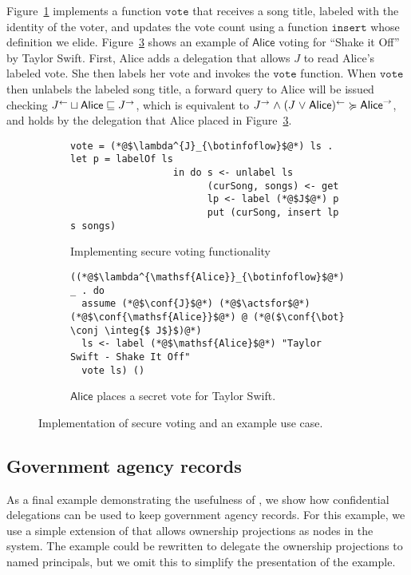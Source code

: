 Figure~\ref{fig:vote-for-song} implements a function $\mathtt{vote}$ that receives a song title, labeled with the identity of the voter, and updates the vote count using a function $\mathtt{insert}$ whose definition we elide. Figure~\ref{fig:jukebox-alice-votes-for-taylor-swift} shows an example of $\mathsf{Alice}$ voting for ``Shake it Off'' by Taylor Swift. First, Alice adds a delegation that allows $J$ to read Alice's labeled vote. She then labels her vote and invokes the $\mathtt{vote}$ function. When $\mathtt{vote}$ then unlabels the labeled song title, a forward query to Alice will be issued checking $J^{\leftarrow} \sqcup \mathsf{Alice} \sqsubseteq J^{\rightarrow}$, which is equivalent to $J^{\rightarrow} \mathrel{\land} (J \mathrel{\lor} \mathsf{Alice})^{\leftarrow} \succcurlyeq \mathsf{Alice}^{\rightarrow}$, and holds by the delegation that Alice placed in Figure~\ref{fig:jukebox-alice-votes-for-taylor-swift}. 

\begin{figure}
\centering
\begin{subfigure}{0.5\textwidth}
\begin{lstlisting}
vote = (*@$\lambda^{J}_{\botinfoflow}$@*) ls . let p = labelOf ls
                  in do s <- unlabel ls
                        (curSong, songs) <- get
                        lp <- label (*@$J$@*) p
                        put (curSong, insert lp s songs)
\end{lstlisting}
\caption{Implementing secure voting functionality}
\label{fig:vote-for-song}
\end{subfigure}
\begin{subfigure}{0.5\textwidth}
\begin{lstlisting}
((*@$\lambda^{\mathsf{Alice}}_{\botinfoflow}$@*) _ . do
  assume (*@$\conf{J}$@*) (*@$\actsfor$@*) (*@$\conf{\mathsf{Alice}}$@*) @ (*@($\conf{\bot} \conj \integ{$ J$}$)@*)
  ls <- label (*@$\mathsf{Alice}$@*) "Taylor Swift - Shake It Off"
  vote ls) ()
\end{lstlisting}
\caption{$\mathsf{Alice}$ places a secret vote for Taylor Swift.}
\label{fig:jukebox-alice-votes-for-taylor-swift}
\end{subfigure}
\caption{Implementation of secure voting and an example use case.}
\end{figure}

\subsection{Government agency records}\label{subsec:agents}
As a final example demonstrating the usefulness of \lang, we show how confidential delegations can be used to keep government agency records. For this example, we use a simple extension of \lang{} that allows ownership projections as nodes in the system. The example could be rewritten to delegate the ownership projections to named principals, but we omit this to simplify the presentation of the example.

